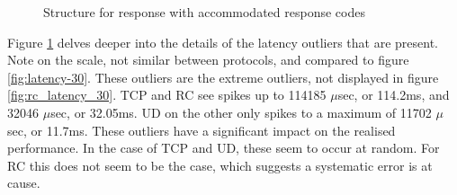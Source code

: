 \begin{figure}
    \centering
    \caption{Structure for response with accommodated response codes}
    \label{fig:latencies_30}
\end{figure}


Figure \ref{fig:latencies_30} delves deeper into the details of the latency outliers that are present.
Note on the scale, not similar between protocols, and compared to figure \ref{fig:latency-30}.
These outliers are the extreme outliers, not displayed in figure \ref{fig:rc_latency_30}.
TCP and RC see spikes up to 114185 $\mu$sec, or 114.2ms, and 32046 $\mu$sec, or 32.05ms.
UD on the other only spikes to a maximum of 11702 $\mu$sec, or 11.7ms.
These outliers have a significant impact on the realised performance.
In the case of TCP and UD, these seem to occur at random.
For RC this does not seem to be the case, which suggests a systematic error is at cause.

